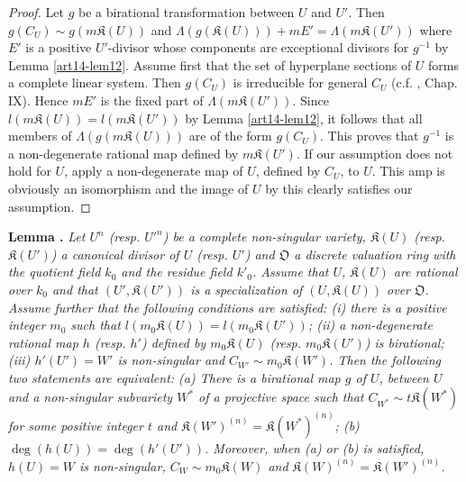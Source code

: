 \begin{proof}
Let $g$ be a birational transformation between $U$ and $U'$. Then $g(C_{U})\sim g(m\mathfrak{K}(U))$ and $\Lambda(g(\mathfrak{K}(U)))+mE'=\Lambda(m\mathfrak{K}(U'))$ where $E'$ is a positive $U'$-divisor whose components are exceptional divisors for $g^{-1}$ by Lemma \ref{art14-lem12}. Assume first that the set of hyperplane sections of $U$ forms a complete linear system. Then $g(C_{U})$ is irreducible for general $C_{U}$ (c.f. \cite{art14-key25}, Chap. IX). Hence $mE'$ is the fixed part of $\Lambda(m\mathfrak{K}(U'))$. Since $l(m\mathfrak{K}(U))=l(m\mathfrak{K}(U'))$ by Lemma \ref{art14-lem12}, it follows that all members of $\Lambda(g(m\mathfrak{K}(U)))$ are of the form $g(C_{U})$. This proves that $g^{-1}$ is a non-degenerate rational map defined by $m\mathfrak{K}(U')$. If our assumption does not hold for $U$, apply a non-degenerate map of $U$, defined by $C_{U}$, to $U$. This amp is obviously an isomorphism and the image of $U$ by this clearly satisfies our assumption.
\end{proof}

\medskip
\noindent
{\bf Lemma .\label{art14-lem13}}
{\em Let $U^{n}$ (resp. ${U'}^{n}$) be a complete non-singular variety, $\mathfrak{K}(U)$ (resp. $\mathfrak{K}(U')$) a canonical divisor of $U$ (resp. $U'$) and $\mathfrak{O}$ a discrete valuation ring with the quotient field $k_{0}$ and the residue field $k'_{0}$. Assume that $U$, $\mathfrak{K}(U)$ are rational over $k_{0}$ and that $(U',\mathfrak{K}(U'))$ is a specialization of $(U,\mathfrak{K}(U))$ over $\mathfrak{O}$. Assume further that the following conditions are satisfied: {\rm(i)} there is a positive integer $m_{0}$ such that $l(m_{0}\mathfrak{K}(U))=l(m_{0}\mathfrak{K}(U'))$; {\rm(ii)} a non-degenerate rational map $h$ (resp. $h'$) defined by $m_{0}\mathfrak{K}(U)$ (resp. $m_{0}\mathfrak{K}(U')$) is birational; {\rm(iii)} $h'(U')=W'$ is non-singular and $C_{W'}\sim m_{0}\mathfrak{K}(W')$. Then the following two statements are equivalent: {\rm(a)} There is a birational map $g$ of $U$, between $U$ and a non-singular subvariety $W^{*}$ of a projective space such that $C_{W^{*}}\sim t\mathfrak{K}(W^{*})$ for some positive integer $t$ and $\mathfrak{K}(W')^{(n)}=\mathfrak{K}(W^{*})^{(n)}$; {\rm(b)} $\deg(h(U))=\deg (h'(U'))$. Moreover, when {\rm(a)} or {\rm(b)} is satisfied, $h(U)=W$ is non-singular, $C_{W}\sim m_{0}\mathfrak{K}(W)$ and $\mathfrak{K}(W)^{(n)}=\mathfrak{K}(W')^{(n)}$.}

